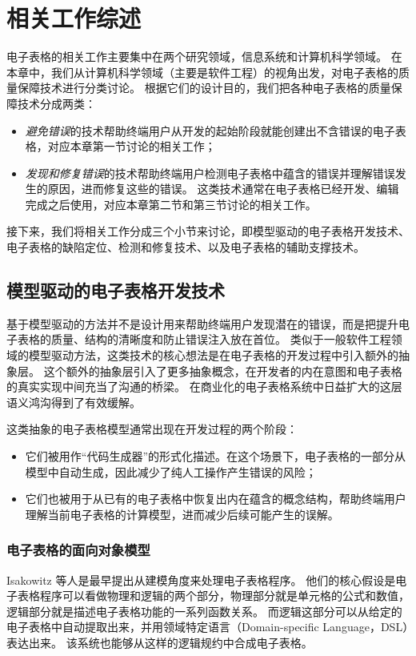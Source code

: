 \chapter{相关工作综述}
电子表格的相关工作主要集中在两个研究领域，信息系统和计算机科学领域。
在本章中，我们从计算机科学领域（主要是软件工程）的视角出发，对电子表格的质量保障技术进行分类讨论。
根据它们的设计目的，我们把各种电子表格的质量保障技术分成两类：
\begin{itemize}
    \item \textit{避免错误}的技术帮助终端用户从开发的起始阶段就能创建出不含错误的电子表格，对应本章第一节讨论的相关工作；
    \item \textit{发现和修复错误}的技术帮助终端用户检测电子表格中蕴含的错误并理解错误发生的原因，进而修复这些的错误。
    这类技术通常在电子表格已经开发、编辑完成之后使用，对应本章第二节和第三节讨论的相关工作。
\end{itemize}

接下来，我们将相关工作分成三个小节来讨论，即模型驱动的电子表格开发技术、电子表格的缺陷定位、检测和修复技术、以及电子表格的辅助支撑技术。


\section{模型驱动的电子表格开发技术}
基于模型驱动的方法并不是设计用来帮助终端用户发现潜在的错误，而是把提升电子表格的质量、结构的清晰度和防止错误注入放在首位。
类似于一般软件工程领域的模型驱动方法，这类技术的核心想法是在电子表格的开发过程中引入额外的抽象层。
这个额外的抽象层引入了更多抽象概念，在开发者的内在意图和电子表格的真实实现中间充当了沟通的桥梁。
在商业化的电子表格系统中日益扩大的这层语义鸿沟\cite{luckey2012systematic}得到了有效缓解。

这类抽象的电子表格模型通常出现在开发过程的两个阶段：
\begin{itemize}
    \item 它们被用作“代码生成器”的形式化描述。在这个场景下，电子表格的一部分从模型中自动生成，因此减少了纯人工操作产生错误的风险；
    \item 它们也被用于从已有的电子表格中恢复出内在蕴含的概念结构，帮助终端用户理解当前电子表格的计算模型，进而减少后续可能产生的误解。
\end{itemize}

\subsection{电子表格的面向对象模型}
Isakowitz 等人\cite{isakowitz1995toward}是最早提出从建模角度来处理电子表格程序。
他们的核心假设是电子表格程序可以看做物理和逻辑的两个部分，物理部分就是单元格的公式和数值，逻辑部分就是描述电子表格功能的一系列函数关系。
而逻辑这部分可以从给定的电子表格中自动提取出来，并用领域特定语言（Domain-specific Language，DSL）表达出来。
该系统也能够从这样的逻辑规约中合成电子表格。

